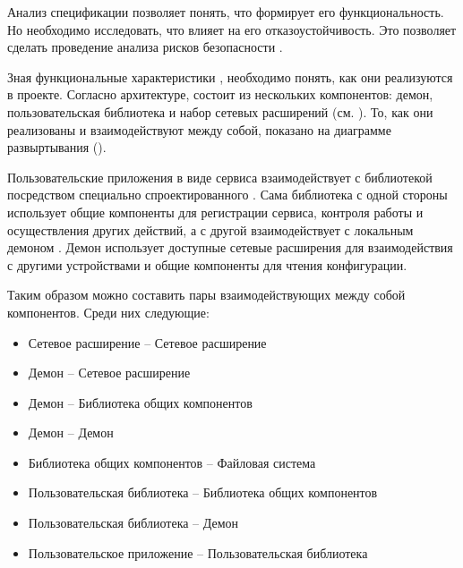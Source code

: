 %
Анализ спецификации \PeerHood позволяет понять, что формирует его функциональность. 
%
Но необходимо исследовать, что влияет на его отказоустойчивость. 
%
Это позволяет сделать проведение анализа рисков безопасности \PeerHood. 

%
Зная функциональные характеристики \PeerHood, необходимо понять, как они реализуются в проекте. 
%
Согласно архитектуре, \PeerHood состоит из нескольких компонентов: демон, пользовательская библиотека и набор сетевых расширений (см. ).
%
То, как они реализованы и взаимодействуют между собой, показано на диаграмме развыртывания \PeerHood (). 


%
Пользовательские приложения в виде сервиса взаимодействует с библиотекой \PeerHood посредством специально спроектированного .
%
Сама библиотека с одной стороны использует общие компоненты для регистрации сервиса, контроля работы \PeerHood и осуществления других действий, а с другой взаимодействует с локальным демоном \PeerHood.
%
Демон \PeerHood использует доступные сетевые расширения для взаимодействия с другими устройствами и общие компоненты для чтения конфигурации. 

%
Таким образом можно составить пары взаимодействующих между собой компонентов.
%
Среди них следующие:
\begin{itemize}
	\setlength{\itemsep}{0pt}%

	\item Сетевое расширение -- Сетевое расширение
	\item Демон -- Сетевое расширение
	\item Демон -- Библиотека общих компонентов
	\item Демон -- Демон
	\item Библиотека общих компонентов -- Файловая система
	\item Пользовательская библиотека -- Библиотека общих компонентов
	\item Пользовательская библиотека -- Демон
	\item Пользовательское приложение -- Пользовательская библиотека
\end{itemize}

